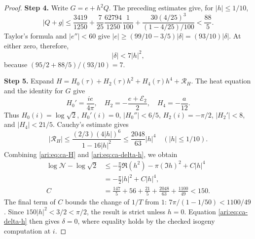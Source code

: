 \documentclass[11pt,a4paper]{article}
\theoremstyle{plain}
\theoremstyle{definition}
\begin{document}
\begin{proof}
\noindent\textbf{Step 4.} Write $G=e+h^2Q$. The preceding estimates give, for $|h|\le1/10$,
\[
 |Q+g|\le
 \frac{3419}{1250}+\frac7{25}\frac{62794}{1250}\frac1{100}
       +\frac{30(4/25)^3}{(1-4/25)/100}<\frac{88}{5}.
\]
Taylor's formula and $|e''|<60$ give
$|e|\ge(99/10-3/5)|\delta|=(93/10)|\delta|$.
At either zero, therefore,
\begin{equation}\label{ari:eq:ca-delta-h}
 |\delta|<7|h|^2,
\end{equation}
because $(95/2+88/5)/(93/10)=7$.


\noindent\textbf{Step 5.} Expand
$H=H_0(\tau)+H_2(\tau)h^2+H_4(\tau)h^4+\mathcal R_H$.
The heat equation and the identity for $G$ give
\[
 H_0'=\frac{ie}{4\pi},\quad
 H_2=-\frac{e+\mathcal E_2}{2},\quad H_4=-\frac a{12}.
\]
Thus $H_0(i)=\log\sqrt2$, $H_0'(i)=0$,
$|H_0''|<6/5$, $H_2(i)=-\pi/2$, $|H_2'|<8$, and
$|H_4|<21/5$. Cauchy's estimate gives
\[
 |\mathcal R_H|\le
 \frac{(2/3)(4|h|)^6}{1-16|h|^2}
 \le\frac{2048}{63}|h|^4
 \quad (|h|\le1/10).
\]
Combining \eqref{ari:eq:ca-H} and \eqref{ari:eq:ca-delta-h}, we obtain
\begin{align*}
 \log \mathcal N-\log\sqrt2
 &\le-\frac\pi2\Re(h^2)-\pi(\Im h)^2+C|h|^4\\
 &=-\frac\pi2|h|^2+C|h|^4,\\
 C&=\frac{147}{5}+56+\frac{21}{5}
                 +\frac{2048}{63}+\frac{1100}{49}<150.
\end{align*}
The final term of $C$ bounds the change of $1/T$ from $1$:
$7\pi/(1-1/50)<1100/49$. Since $150|h|^2<3/2<\pi/2$,
the result is strict unless $h=0$. Equation
\eqref{ari:eq:ca-delta-h} then gives $\delta=0$, where equality
holds by the checked isogeny computation at $i$.
\end{proof}
\end{document}
